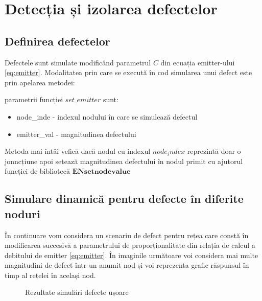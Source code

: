 \chapter{Detecția și izolarea defectelor}
\label{chap:detectie}
\section{Definirea defectelor}
Defectele sunt simulate modificând parametrul $C$ din ecuația emitter-ului \eqref{eq:emitter}. Modalitatea prin care se execută în cod simularea unui defect este prin apelarea metodei:



parametrii funcției $set\_emitter$ sunt:
\begin{itemize}
\item node\_inde - indexul nodului în care se simulează defectul
\item emitter\_val - magnitudinea defectului
\end{itemize}

Metoda mai întâi vefică dacă nodul cu indexul $node_index$ reprezintă doar o jonncțiune apoi setează magnitudinea defectului în nodul primit cu ajutorul funcției de bibliotecă $\mathbf{ENsetnodevalue}$ 

\section{Simulare dinamică pentru defecte în diferite noduri}

În continuare vom considera un scenariu de defect pentru rețea care constă în modificarea succesivă a parametrului de proporționalitate din relația de calcul a debitului de emitter \eqref{eq:emitter}. În imaginile următoare voi considera mai multe magnitudini de defect într-un anumit nod și voi reprezenta grafic răspunsul în timp al rețelei în același nod.

\begin{figure}[H]

\qquad
{}

\caption{Rezultate simulări defecte ușoare}
\label{fig:ref_emitter_soft}
\end{figure}

